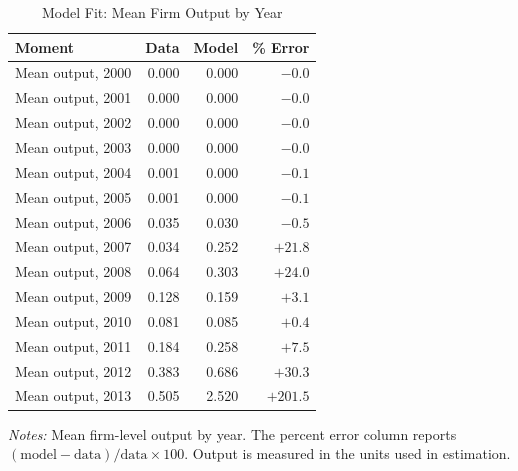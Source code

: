 \documentclass[12pt]{article}
\begin{document}
\begin{table}[htbp]
\centering
\small
\caption{Model Fit: Mean Firm Output by Year}
\label{tab:moment_fit_mean_output}
\begin{tabular}{lrrr}
\toprule
Moment & Data & Model & \% Error \\
\midrule
Mean output, 2000 & 0.000 & 0.000 & $-0.0$ \\
Mean output, 2001 & 0.000 & 0.000 & $-0.0$ \\
Mean output, 2002 & 0.000 & 0.000 & $-0.0$ \\
Mean output, 2003 & 0.000 & 0.000 & $-0.0$ \\
Mean output, 2004 & 0.001 & 0.000 & $-0.1$ \\
Mean output, 2005 & 0.001 & 0.000 & $-0.1$ \\
Mean output, 2006 & 0.035 & 0.030 & $-0.5$ \\
Mean output, 2007 & 0.034 & 0.252 & $+21.8$ \\
Mean output, 2008 & 0.064 & 0.303 & $+24.0$ \\
Mean output, 2009 & 0.128 & 0.159 & $+3.1$ \\
Mean output, 2010 & 0.081 & 0.085 & $+0.4$ \\
Mean output, 2011 & 0.184 & 0.258 & $+7.5$ \\
Mean output, 2012 & 0.383 & 0.686 & $+30.3$ \\
Mean output, 2013 & 0.505 & 2.520 & $+201.5$ \\
\bottomrule
\end{tabular}
\begin{minipage}{0.85\textwidth}
\footnotesize
\vspace{0.5em}
\textit{Notes:} Mean firm-level output by year. The percent error column reports $(\text{model} - \text{data})/\text{data} \times 100$. Output is measured in the units used in estimation.
\end{minipage}
\end{table}
 
\end{document}
